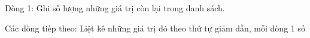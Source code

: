Dòng 1: Ghi số lượng những giá trị còn lại trong danh sách.  

   Các dòng tiếp theo: Liệt kê những giá trị đó theo thứ tự giảm dần, mỗi dòng 1 số